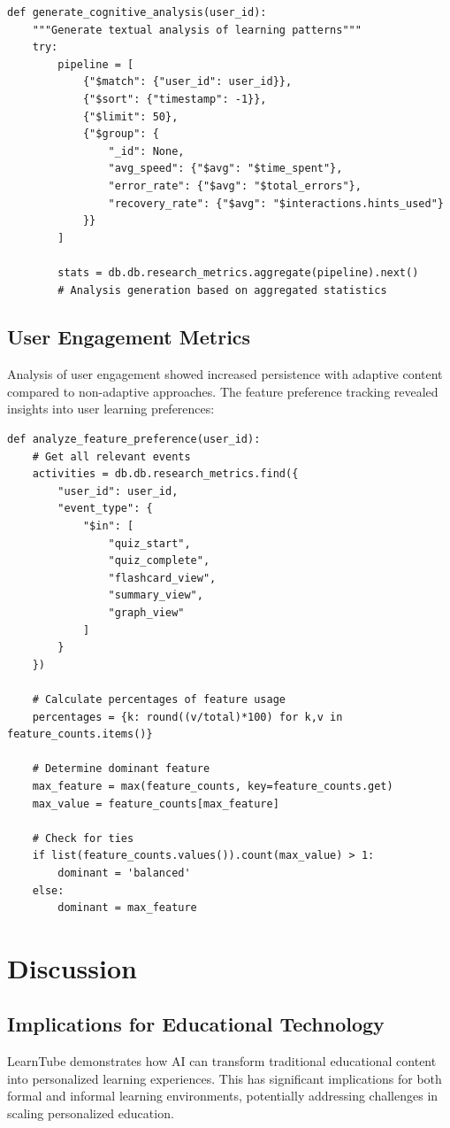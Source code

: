 \documentclass[conference]{IEEEtran}
\begin{document}
\begin{verbatim}
def generate_cognitive_analysis(user_id):
    """Generate textual analysis of learning patterns"""
    try:
        pipeline = [
            {"$match": {"user_id": user_id}},
            {"$sort": {"timestamp": -1}},
            {"$limit": 50},
            {"$group": {
                "_id": None,
                "avg_speed": {"$avg": "$time_spent"},
                "error_rate": {"$avg": "$total_errors"},
                "recovery_rate": {"$avg": "$interactions.hints_used"}
            }}
        ]
        
        stats = db.db.research_metrics.aggregate(pipeline).next()
        # Analysis generation based on aggregated statistics
\end{verbatim}

\subsection{User Engagement Metrics}
Analysis of user engagement showed increased persistence with adaptive content compared to non-adaptive approaches. The feature preference tracking revealed insights into user learning preferences:

\begin{verbatim}
def analyze_feature_preference(user_id):
    # Get all relevant events
    activities = db.db.research_metrics.find({
        "user_id": user_id,
        "event_type": {
            "$in": [
                "quiz_start", 
                "quiz_complete",
                "flashcard_view",
                "summary_view",
                "graph_view"
            ]
        }
    })

    # Calculate percentages of feature usage
    percentages = {k: round((v/total)*100) for k,v in feature_counts.items()}

    # Determine dominant feature
    max_feature = max(feature_counts, key=feature_counts.get)
    max_value = feature_counts[max_feature]
    
    # Check for ties
    if list(feature_counts.values()).count(max_value) > 1:
        dominant = 'balanced'
    else:
        dominant = max_feature
\end{verbatim}

\section{Discussion}
\subsection{Implications for Educational Technology}
LearnTube demonstrates how AI can transform traditional educational content into personalized learning experiences. This has significant implications for both formal and informal learning environments, potentially addressing challenges in scaling personalized education.
\end{document}
